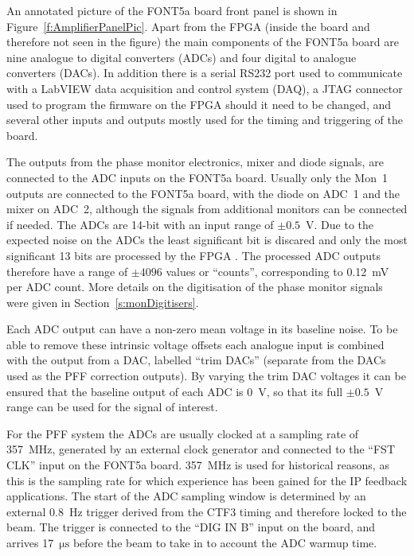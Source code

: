 An annotated picture of the FONT5a board front panel is shown in Figure~\ref{f:AmplifierPanelPic}. Apart from the FPGA (inside the board and therefore not seen in the figure) the main components of the FONT5a board are nine analogue to digital converters (ADCs) and four digital to analogue converters (DACs). In addition there is a serial RS232 port used to communicate with a LabVIEW data acquisition and control system (DAQ), a JTAG connector used to program the firmware on the FPGA should it need to be changed, and several other inputs and outputs mostly used for the timing and triggering of the board.

The outputs from the phase monitor electronics, mixer and diode signals, are connected to the ADC inputs on the FONT5a board. Usually only the Mon~1 outputs are connected to the FONT5a board, with the diode on ADC~1 and the mixer on ADC~2, although the signals from additional monitors can be connected if needed. The ADCs are 14-bit with an input range of \(\pm0.5\)~V. Due to the expected noise on the ADCs the least significant bit is discared and only the most significant 13 bits are processed by the FPGA \cite{fontPaper}. The processed ADC outputs therefore have a range of \(\pm4096\) values or ``counts'', corresponding to 0.12~mV per ADC count. More details on the digitisation of the phase monitor signals were given in Section~\ref{s:monDigitisers}. 

Each ADC output can have a non-zero mean voltage in its baseline noise. To be able to remove these intrinsic voltage offsets each analogue input is combined with the output from a DAC, labelled ``trim DACs'' (separate from the DACs used as the PFF correction outputs). By varying the trim DAC voltages it can be ensured that the baseline output of each ADC is 0~V, so that its full \(\pm0.5\)~V range can be used for the signal of interest.

For the PFF system the ADCs are usually clocked at a sampling rate of 357~MHz, generated by an external clock generator \cite{srsClockGen} and connected to the ``FST CLK'' input on the FONT5a board. 357~MHz is used for historical reasons, as this is the sampling rate for which experience has been gained for the IP feedback applications. The start of the ADC sampling window is determined by an external 0.8~Hz trigger derived from the CTF3 timing and therefore locked to the beam. The trigger is connected to the ``DIG IN B'' input on the board, and arrives 17~\(\mathrm{\mu s}\) before the beam to take in to account the ADC warmup time.

